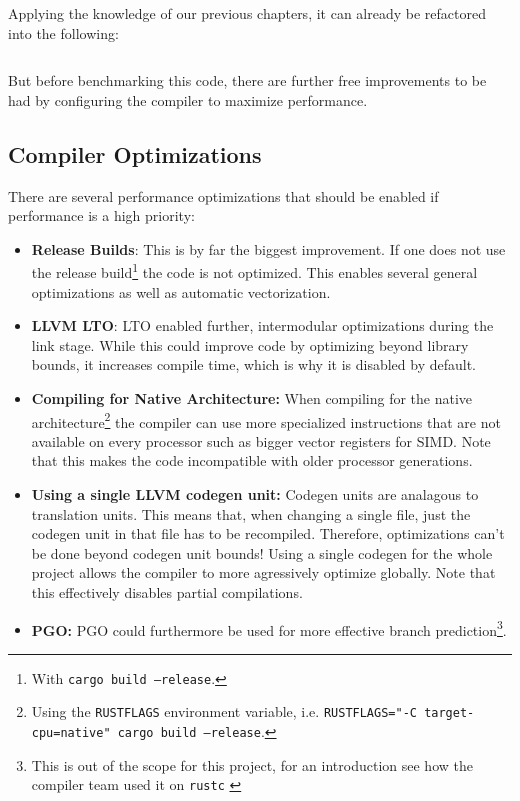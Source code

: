 Applying the knowledge of our previous chapters, it can already be refactored into the following:

\begin{listing}[H]
  \inputminted{rust}{./assets/variadic_optimized.rs}
\caption{The code optimized analagously to chapter 2.}
\end{listing}

But before benchmarking this code, there are further free improvements to be had by configuring the compiler to maximize performance.

\subsection{Compiler Optimizations}
There are several performance optimizations that should be enabled if performance is a high priority:
\begin{itemize}
  \item \textbf{Release Builds}: This is by far the biggest improvement. If one does not use the release build\footnote{With \texttt{cargo build --release}.} the code is not optimized. This enables several general optimizations as well as automatic vectorization.
  \item \textbf{\ac{LLVM} \ac{LTO}}: \ac{LTO} enabled further, intermodular optimizations during the link stage. While this could improve code by optimizing beyond library bounds, it increases compile time, which is why it is disabled by default.
  \item \textbf{Compiling for Native Architecture:} When compiling for the native architecture\footnote{Using the \texttt{RUSTFLAGS} environment variable, i.e. \texttt{RUSTFLAGS="-C target-cpu=native" cargo build --release}.} the compiler can use more specialized instructions that are not available on every processor such as bigger vector registers for SIMD. Note that this makes the code incompatible with older processor generations.
  \item \textbf{Using a single \ac{LLVM} codegen unit:} Codegen units are analagous to translation units. This means that, when changing a single file, just the codegen unit in that file has to be recompiled. Therefore, optimizations can't be done beyond codegen unit bounds! Using a single codegen for the whole project allows the compiler to more agressively optimize globally. Note that this effectively disables partial compilations.
  \item \textbf{\ac{PGO}:} \ac{PGO} could furthermore be used for more effective branch prediction\footnote{This is out of the scope for this project, for an introduction see how the compiler team used it on \texttt{rustc} \cite{pgo}}.
\end{itemize}

